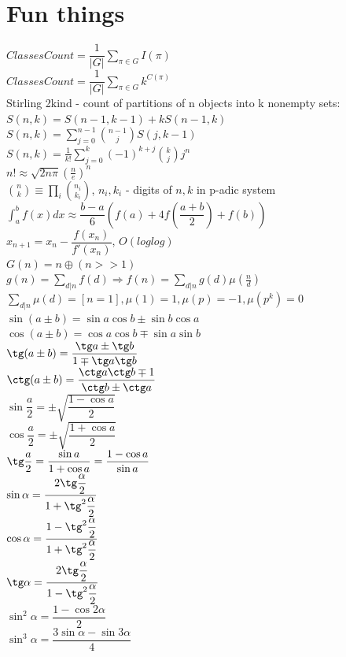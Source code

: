 \section{Fun things}
$ClassesCount = \dfrac{1}{|G|} \sum_{\pi \in G} I(\pi)$\\
$ClassesCount = \dfrac{1}{|G|} \sum_{\pi \in G} k^{C(\pi)}$\\
Stirling 2kind - count of partitions of n objects into k nonempty sets:\\
$S(n,k) = S(n-1,k-1) + kS(n-1,k)$\\
$S(n,k) = \sum_{j=0}^{n-1} \binom{n-1}{j}S(j,k-1)$\\
$S(n,k) = \frac{1}{k!}\sum_{j=0}^k(-1)^{k+j}\binom{k}{j}j^n$\\
$n! \approx \sqrt{2n\pi}(\frac{n}{e})^n$\\
$\binom{n}{k} \equiv \prod_{i}\binom{n_i}{k_i}$, $n_i, k_i$ - digits of $n,k$ in p-adic system
$\int_{a}^{b}f(x)dx \approx \dfrac{b-a}{6}(f(a) + 4f(\dfrac{a+b}
{2})+f(b))$\\
$x_{n+1} = x_n - \dfrac{f(x_n)}{f'(x_n)}$, $O(loglog)$\\
$G(n) = n \oplus (n >> 1)$\\
$g(n) = \sum_{d|n} f(d) \Rightarrow f(n) = \sum_{d|n} g(d) \mu(\frac{n}{d})$\\
$\sum_{d|n} \mu(d) = [n = 1],   \mu(1) = 1, \mu(p) = -1, \mu(p^k) = 0$\\
$\sin(a \pm b) = \sin a \cos b \pm \sin b \cos a$\\
$\cos(a \pm b) = \cos a \cos b \mp \sin a \sin b$\\
$\tg(a\pm b) = \dfrac{\tg a \pm \tg b}{1 \mp \tg a \tg b}$\\
$\ctg(a \pm b) = \dfrac{\ctg a \ctg b \mp 1}{\ctg b \pm \ctg a}$\\
$\sin \dfrac{a}{2} = \pm \sqrt{\dfrac{1-\cos a}{2}}$\\
$\cos \dfrac{a}{2} = \pm \sqrt{\dfrac{1+\cos a}{2}}$\\
$\tg \dfrac{a}{2} = \dfrac{\sin a}{1 + \cos a} = \dfrac{1 - \cos a}{\sin a}$\\
$\sin \alpha = \dfrac{2\tg \dfrac{\alpha}{2}}{1 + \tg^2\dfrac{\alpha}{2}}$\\
$\cos \alpha = \dfrac{1 - \tg^2\dfrac{\alpha}{2}}{1 +\tg^2\dfrac{\alpha}{2}}$\\
$\tg \alpha = \dfrac{2\tg \dfrac{\alpha}{2}}{1 - \tg^2\dfrac{\alpha}{2}}$\\
$\sin^2 \alpha  = \dfrac{1-\cos 2\alpha}{2}$\\
$\sin^3 \alpha  = \dfrac{3\sin\alpha -\sin 3\alpha }{4}$\\

